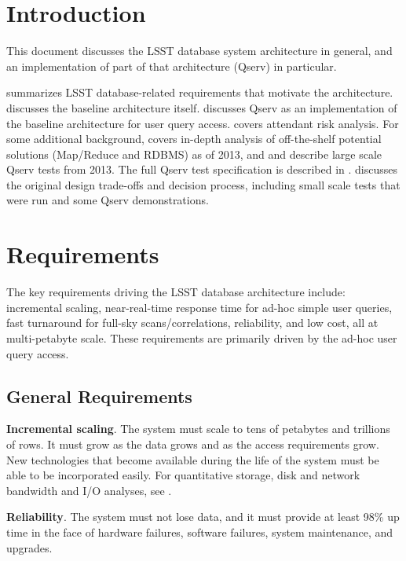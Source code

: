 \documentclass[DM,lsstdraft,toc]{lsstdoc}
\begin{document}
\section{Introduction}\label{introduction}

This document discusses the LSST database system architecture in general,
and an implementation of part of that architecture (Qserv) in particular.

 summarizes LSST database-related requirements that
motivate the architecture.  discusses the
baseline architecture itself.  discusses Qserv as an
implementation of the baseline architecture for user query access.
 covers attendant risk analysis. For some additional
background,  covers in-depth analysis of off-the-shelf
potential solutions (Map/Reduce and RDBMS) as of 2013, and 
and  describe large scale Qserv tests from 2013. The full
Qserv test specification is described in . 
discusses the original design trade-offs and decision process, including small
scale tests that were run and some Qserv demonstrations.

\section{Requirements}\label{requirements}

The key requirements driving the LSST database architecture include:
incremental scaling, near-real-time response time for ad-hoc simple user
queries, fast turnaround for full-sky scans/correlations, reliability,
and low cost, all at multi-petabyte scale. These requirements are
primarily driven by the ad-hoc user query access.

\subsection{General Requirements}\label{general-requirements}

\textbf{Incremental scaling}. The system must scale to tens of petabytes and
trillions of rows. It must grow as the data grows and as the access
requirements grow. New technologies that become available during the life of
the system must be able to be incorporated easily. For quantitative storage,
disk and network bandwidth and I/O analyses, see .

\textbf{Reliability}. The system must not lose data, and it must provide
at least 98\% up time in the face of hardware failures, software
failures, system maintenance, and upgrades.
\end{document}
